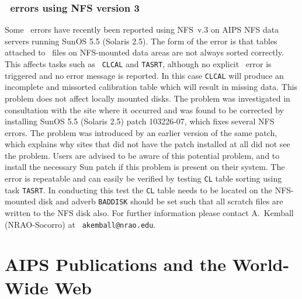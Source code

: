 \subsubsection{\AIPS\ errors using NFS version 3}

Some \AIPS\ errors have recently been reported using NFS~v.3 on AIPS
NFS data servers running SunOS 5.5 (Solaris 2.5). The form of the
error is that tables attached to \AIPS\ files on NFS-mounted data
areas are not always sorted correctly. This affects tasks such as {\tt
CLCAL} and {\tt TASRT}, although no explicit \AIPS\ error is triggered
and no error message is reported. In this case {\tt CLCAL} will
produce an incomplete and missorted calibration table which will
result in missing data. This problem does not affect locally mounted
disks. The problem was investigated in consultation with the site
where it occurred and was found to be corrected by installing SunOS
5.5 (Solaris 2.5) patch 103226-07, which fixes several NFS errors. The
problem was introduced by an earlier version of the same patch, which
explains why sites that did not have the patch installed at all did
not see the problem.  Users are advised to be aware of this potential
problem, and to install the necessary Sun patch if this problem is
present on their system. The error is repeatable and can easily be
verified by testing {\tt CL} table sorting using task {\tt TASRT}.  In
conducting this test the {\tt CL} table needs to be located on the
NFS-mounted disk and adverb {\tt BADDISK} should be set such that all
scratch files are written to the NFS disk also. For further
information please contact A.~Kemball (NRAO-Socorro) at {\tt
akemball@nrao.edu}.


\section{AIPS Publications and the World-Wide Web}

